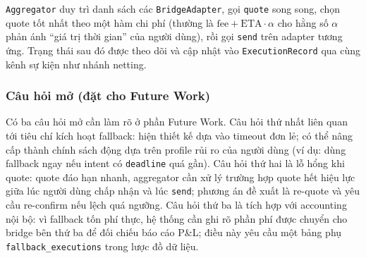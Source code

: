 \texttt{Aggregator} duy trì danh sách các \texttt{BridgeAdapter}, gọi \texttt{quote} song song, chọn quote tốt nhất theo một hàm chi phí (thường là $\mathrm{fee} + \mathrm{ETA} \cdot \alpha$ cho hằng số $\alpha$ phản ánh ``giá trị thời gian'' của người dùng), rồi gọi \texttt{send} trên adapter tương ứng. Trạng thái sau đó được theo dõi và cập nhật vào \texttt{ExecutionRecord} qua cùng kênh sự kiện như nhánh netting.

\subsubsection{Câu hỏi mở (đặt cho Future Work)}

Có ba câu hỏi mở cần làm rõ ở phần Future Work. Câu hỏi thứ nhất liên quan tới tiêu chí kích hoạt fallback: hiện thiết kế dựa vào timeout đơn lẻ; có thể nâng cấp thành chính sách động dựa trên profile rủi ro của người dùng (ví dụ: dùng fallback ngay nếu intent có \texttt{deadline} quá gần). Câu hỏi thứ hai là lỗ hổng khi quote: quote đáo hạn nhanh, aggregator cần xử lý trường hợp quote hết hiệu lực giữa lúc người dùng chấp nhận và lúc \texttt{send}; phương án đề xuất là re-quote và yêu cầu re-confirm nếu lệch quá ngưỡng. Câu hỏi thứ ba là tích hợp với accounting nội bộ: vì fallback tốn phí thực, hệ thống cần ghi rõ phần phí được chuyển cho bridge bên thứ ba để đối chiếu báo cáo P\&L; điều này yêu cầu một bảng phụ \texttt{fallback\_executions} trong lược đồ dữ liệu.

